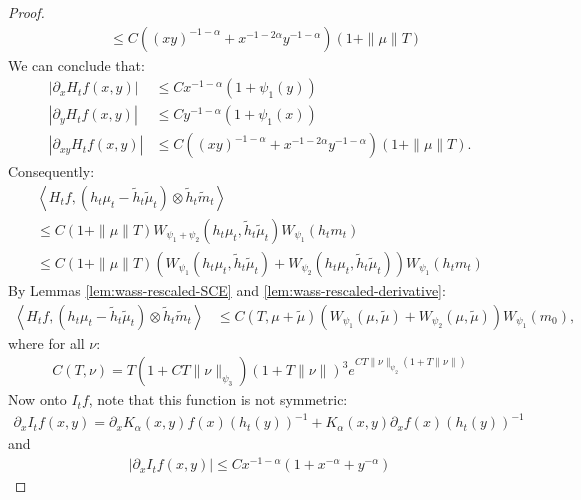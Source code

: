 \documentclass[11pt,a4paper]{article}
\newcommand{\brac}[1]{\left\langle#1\right\rangle}
\begin{document}
\begin{proof}
\begin{align*}
        &\leq C \left((xy)^{-1-\alpha} + x^{-1-2\alpha}y^{-1-\alpha} \right)\left(1 + \|\mu\|T\right)
    \end{align*}
    We can conclude that:
    \begin{align*}
        \left|\partial_x H_tf(x,y)\right| &\leq C x^{-1-\alpha} (1 + \psi_1(y)) \\
        \left|\partial_y H_tf(x,y)\right| &\leq C y^{-1-\alpha} (1 + \psi_1(x)) \\
        \left|\partial_{xy}H_tf(x,y) \right| &\leq  C \left((xy)^{-1-\alpha} + x^{-1-2\alpha}y^{-1-\alpha} \right)\left(1 + \|\mu\|T\right).
    \end{align*}
    Consequently:
    \begin{multline*}
        \brac{H_tf,\left(h_t\mu_t - \tilde{h}_t\tilde{\mu}_t\right)\otimes \tilde{h}_t\tilde{m}_t} \\
        \leq C\left(1 + \|\mu\|T\right)W_{\psi_1 + \psi_2}\left( h_t\mu_t , \tilde{h}_t\tilde{\mu}_t\right)W_{\psi_1}\left(h_t m_t \right) \\
        \leq C\left(1 + \|\mu\|T\right)\left(W_{\psi_1}\left( h_t\mu_t , \tilde{h}_t\tilde{\mu}_t\right) + W_{\psi_2}\left( h_t\mu_t , \tilde{h}_t\tilde{\mu}_t\right)\right)W_{\psi_1}\left(h_t m_t \right)
    \end{multline*}
    By Lemmas \ref{lem:wass-rescaled-SCE} and \ref{lem:wass-rescaled-derivative}:
    \begin{align*}
        \brac{H_tf,\left(h_t\mu_t - \tilde{h}_t\tilde{\mu}_t\right)\otimes \tilde{h}_t\tilde{m}_t}  
        &\leq C(T,\mu + \tilde{\mu})\left(W_{\psi_1}\left( \mu , \tilde{\mu}\right) + W_{\psi_2}\left( \mu , \tilde{\mu}\right)\right)W_{\psi_1}\left(m_0\right),
    \end{align*}
    where for all $ \nu$:
    \begin{align*}
        C(T,\nu) = T(1 + CT\|\nu\|_{\psi_3})(1 + T\|\nu\|)^3 e^{CT\|\nu\|_{\psi_2}\left(1 + T\|\nu\|\right)}
    \end{align*}
    Now onto $I_tf$, note that this function is not symmetric:
    \begin{align*}
        \partial_x I_tf(x,y) = \partial_x K_\alpha(x,y) f(x) \left(h_t(y)\right)^{-1} + K_\alpha(x,y) \partial_x f(x)  \left(h_t(y)\right)^{-1}
    \end{align*}
    and
    \begin{align*}
        \left| \partial_x I_tf(x,y)\right|  \leq C x^{-1-\alpha} (1 + x^{-\alpha} + y^{-\alpha})
    \end{align*}

\end{proof}
\end{document}
